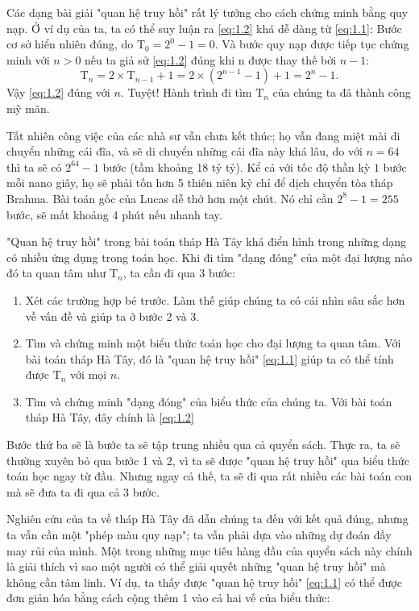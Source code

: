 Các dạng bài giải "quan hệ truy hồi" rất lý tưởng cho cách chứng minh bằng quy nạp. Ở ví dụ của ta, ta có thể suy luận ra \eqref{eq:1.2} khá dễ dàng từ \eqref{eq:1.1}: Bước cơ sở hiển nhiên đúng, do $\mathrm{T}_0 = 2^0 - 1 = 0$. Và bước quy nạp được tiếp tục chứng minh với $n > 0$ nếu ta giả sử \eqref{eq:1.2} đúng khi n được thay thế bởi $n - 1$:
$$\mathrm{T}_n = 2 \times \mathrm{T}_{n - 1}  + 1 = 2 \times (2^{n - 1} - 1) + 1 = 2^n - 1.$$
Vậy \eqref{eq:1.2} đúng với $n$. Tuyệt! Hành trình đi tìm $\mathrm{T}_n$ của chúng ta đã thành công mỹ mãn.

Tất nhiên công việc của các nhà sư vẫn chưa kết thúc; họ vẫn đang miệt mài di chuyển những cái đĩa, và sẽ di chuyển những cái đĩa này khá lâu, do với $n = 64$ thì ta sẽ có $2^64 - 1$ bước (tầm khoảng 18 tỷ tỷ). Kể cả với tốc độ thần kỳ $1$ bước mỗi nano giây, họ sẽ phải tốn hơn 5 thiên niên kỷ chỉ để dịch chuyển tòa tháp Brahma. Bài toán gốc của Lucas dễ thở hơn một chút. Nó chỉ cần $2 ^ 8 - 1 = 255$ bước, sẽ mất khoảng 4 phút nếu nhanh tay.

"Quan hệ truy hồi" trong bài toán tháp Hà Tây khá điển hình trong những dạng có nhiều ứng dụng trong toán học. Khi đi tìm "dạng đóng" của một đại lượng nào đó ta quan tâm như $\mathrm{T}_n$, ta cần đi qua 3 bước:
\begin{enumerate}
    \item Xét các trường hợp bé trước. Làm thế giúp chúng ta có cái nhìn sâu sắc hơn về vấn đề và giúp ta ở bước 2 và 3.
    \item Tìm và chứng minh 
    một biểu thức toán học cho đại lượng ta quan tâm. Với bài toán tháp Hà Tây, đó là "quan hệ truy hồi" \eqref{eq:1.1} giúp ta có thể tính được $\mathrm{T}_n$ với mọi $n$.
    \item Tìm và chứng minh "dạng đóng" của biểu thức của chúng ta. Với bài toán tháp Hà Tây, đây chính là \eqref{eq:1.2}
\end{enumerate}
Bước thứ ba sẽ là bước ta sẽ tập trung nhiều qua cả quyển sách. Thực ra, ta sẽ thường xuyên bỏ qua bước 1 và 2, vì ta sẽ được "quan hệ truy hồi" qua biểu thức toán học ngay từ đầu. Nhưng ngay cả thế, ta sẽ đi qua rất nhiều các bài toán con mà sẽ đưa ta đi qua cả 3 bước.

Nghiên cứu của ta về tháp Hà Tây đã dẫn chúng ta đến với kết quả đúng, nhưng ta vẫn cần một "phép màu quy nạp"; ta vẫn phải dựa vào những dự đoán đầy may rủi của mình. Một trong những mục tiêu hàng đầu của quyển sách này chính là giải thích vì sao một người có thể giải quyết những "quan hệ truy hồi" mà không cần tâm linh. Ví dụ, ta thấy được "quan hệ truy hồi" \eqref{eq:1.1} có thể được đơn giản hóa bằng cách cộng thêm 1 vào cả hai vế của biểu thức:


